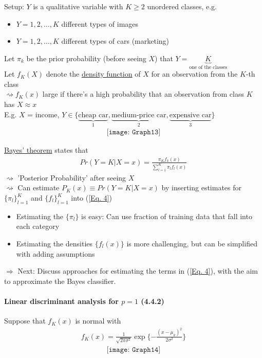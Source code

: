 \documentclass[11pt,a4paper,numbers=endperiod]{scrartcl}
\begin{document}
{Setup: $Y$ is a qualitative variable with $K \geq 2$ unordered classes, e.g. \begin{itemize}
	\item $Y = 1, 2, \ldots, K$ different types of images
	\item $Y = 1, 2, \ldots, K$ different types of cars (marketing) 
\end{itemize}
Let $\pi_k$ be the prior probability (before seeing $X$) that $Y = \underbrace{K}_{\text{one of the classes}}$\\
Let $f_K(X)$ denote the \underline{density function} of $X$ for an observation from the $K$-th class\\
$\rightsquigarrow f_K(x)$ large if there's a high probability that an observation from class $K$ has $X \approx x$\\ 
E.g. $X$ = income, $Y \in \{\underbrace{\text{cheap car}}_1, \underbrace{\text{medium-price car}}_2, \underbrace{\text{expensive car}}_3\}$
\begin{align*}
	\texttt{[image: Graph13]}
\end{align*}
	
\underline{Bayes' theorem} states that \begin{align}
	Pr(Y = K| X = x) = \frac{\pi_K f_k(x)}{\sum\limits_{l = 1}^K \pi_l f_l(x)}  \label{Eq. 4}
\end{align}	
$\rightsquigarrow$ 'Posterior Probability' after seeing $X$\\
$\rightsquigarrow$ Can estimate $P_K(x) \equiv Pr(Y = K|X = x)$ by inserting estimates for $\{\pi_l\}_{l = 1}^K$ and $\{f_l\}_{l = 1}^K$ into (\ref*{Eq. 4})
\begin{itemize}
	\item Estimating the $\{\pi_l\}$ is easy: Can use fraction of training data that fall into each category
	\item Estimating the densities $\{f_l(x)\}$ is more challenging, but can be simplified with adding assumptions
\end{itemize}
$\Rightarrow$ Next: Discuss approaches for estimating the terms in (\ref*{Eq. 4}), with the aim to approximate the Bayes classifier.\\
\newpage
\paragraph{Linear discriminant analysis for $p = 1$ (4.4.2)}
$ $\\

Suppose that $f_K(x)$ is normal with \begin{align*}
	f_K(x) = \frac{1}{\sqrt{2 \pi \sigma^2}} \exp\{- \frac{(x - \mu_k)^2}{2 \sigma^2}\}
\end{align*}	
\begin{align*}
	\texttt{[image: Graph14]}
\end{align*}

}
\end{document}
